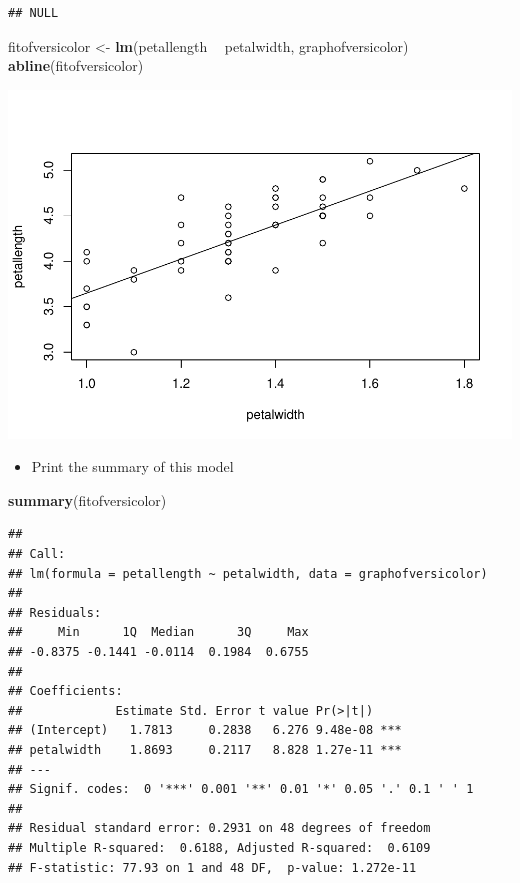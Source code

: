 \documentclass[]{article}
\newenvironment{Shaded}{\begin{snugshade}}{\end{snugshade}}
\newcommand{\KeywordTok}[1]{\textcolor[rgb]{0.13,0.29,0.53}{\textbf{#1}}}
\newcommand{\NormalTok}[1]{#1}
\newcommand{\OperatorTok}[1]{\textcolor[rgb]{0.81,0.36,0.00}{\textbf{#1}}}
\newcommand{\StringTok}[1]{\textcolor[rgb]{0.31,0.60,0.02}{#1}}
\providecommand{\tightlist}{%
  \setlength{\itemsep}{0pt}\setlength{\parskip}{0pt}}
\begin{document}
\begin{verbatim}
## NULL
\end{verbatim}

\begin{Shaded}
\begin{Highlighting}[]
\NormalTok{fitofversicolor <-}\StringTok{ }\KeywordTok{lm}\NormalTok{(petallength }\OperatorTok{~}\StringTok{ }\NormalTok{petalwidth, graphofversicolor)}
\KeywordTok{abline}\NormalTok{(fitofversicolor)}
\end{Highlighting}
\end{Shaded}

\includegraphics{1808-351-351m451-hw1-Mitra_files/figure-latex/unnamed-chunk-8-1.pdf}

\begin{itemize}
\tightlist
\item
  Print the summary of this model
\end{itemize}

\begin{Shaded}
\begin{Highlighting}[]
\KeywordTok{summary}\NormalTok{(fitofversicolor)}
\end{Highlighting}
\end{Shaded}

\begin{verbatim}
## 
## Call:
## lm(formula = petallength ~ petalwidth, data = graphofversicolor)
## 
## Residuals:
##     Min      1Q  Median      3Q     Max 
## -0.8375 -0.1441 -0.0114  0.1984  0.6755 
## 
## Coefficients:
##             Estimate Std. Error t value Pr(>|t|)    
## (Intercept)   1.7813     0.2838   6.276 9.48e-08 ***
## petalwidth    1.8693     0.2117   8.828 1.27e-11 ***
## ---
## Signif. codes:  0 '***' 0.001 '**' 0.01 '*' 0.05 '.' 0.1 ' ' 1
## 
## Residual standard error: 0.2931 on 48 degrees of freedom
## Multiple R-squared:  0.6188, Adjusted R-squared:  0.6109 
## F-statistic: 77.93 on 1 and 48 DF,  p-value: 1.272e-11
\end{verbatim}
\end{document}

